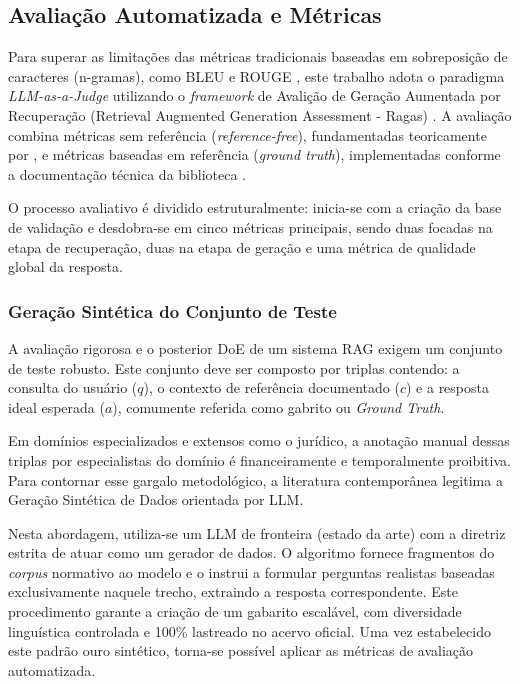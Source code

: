 \subsection{Avaliação Automatizada e Métricas}

Para superar as limitações das métricas tradicionais baseadas em sobreposição de caracteres (n-gramas), como BLEU \citep{papineni-etal-2002-bleu} e ROUGE \citep{lin-2004-rouge}, este trabalho adota o paradigma \textit{LLM-as-a-Judge} \citep{zheng2023} utilizando o \textit{framework} de Avalição de Geração Aumentada por Recuperação (Retrieval Augmented Generation Assessment - Ragas) \citep{ragas2023}. A avaliação combina métricas sem referência (\textit{reference-free}), fundamentadas teoricamente por \citet{es2023}, e métricas baseadas em referência (\textit{ground truth}), implementadas conforme a documentação técnica da biblioteca \citep{ragasdocs}.

O processo avaliativo é dividido estruturalmente: inicia-se com a criação da base de validação e desdobra-se em cinco métricas principais, sendo duas focadas na etapa de recuperação, duas na etapa de geração e uma métrica de qualidade global da resposta.

\subsubsection{Geração Sintética do Conjunto de Teste}

A avaliação rigorosa e o posterior DoE de um sistema RAG exigem um conjunto de teste robusto. Este conjunto deve ser composto por triplas contendo: a consulta do usuário ($q$), o contexto de referência documentado ($c$) e a resposta ideal esperada ($a$), comumente referida como gabrito ou \textit{Ground Truth}.

Em domínios especializados e extensos como o jurídico, a anotação manual dessas triplas por especialistas do domínio é financeiramente e temporalmente proibitiva. Para contornar esse gargalo metodológico, a literatura contemporânea legitima a Geração Sintética de Dados orientada por LLM.

Nesta abordagem, utiliza-se um LLM de fronteira (estado da arte) com a diretriz estrita de atuar como um gerador de dados. O algoritmo fornece fragmentos do \textit{corpus} normativo ao modelo e o instrui a formular perguntas realistas baseadas exclusivamente naquele trecho, extraindo a resposta correspondente. Este procedimento garante a criação de um gabarito escalável, com diversidade linguística controlada e 100\% lastreado no acervo oficial. Uma vez estabelecido este padrão ouro sintético, torna-se possível aplicar as métricas de avaliação automatizada.

